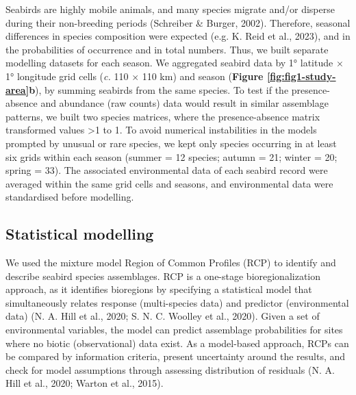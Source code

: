 \documentclass{article}
\begin{document}
\begin{linenumbers}
Seabirds are highly mobile animals, and many species migrate and/or disperse during their non-breeding periods (Schreiber \& Burger, 2002). Therefore, seasonal differences in species composition were expected (e.g. K. Reid et al., 2023), and in the probabilities of occurrence and in total numbers. Thus, we built separate modelling datasets for each season. We aggregated seabird data by 1° latitude \(\times\) 1° longitude grid cells (\emph{c.} 110 \(\times\) 110 km) and season (\textbf{Figure \ref{fig:fig1-study-area}b}), by summing seabirds from the same species. To test if the presence-absence and abundance (raw counts) data would result in similar assemblage patterns, we built two species matrices, where the presence-absence matrix transformed values \textgreater1 to 1. To avoid numerical instabilities in the models prompted by unusual or rare species, we kept only species occurring in at least six grids within each season (summer = 12 species; autumn = 21; winter = 20; spring = 33). The associated environmental data of each seabird record were averaged within the same grid cells and seasons, and environmental data were standardised before modelling.

\hypertarget{statistical-modelling}{%
\subsection{Statistical modelling}\label{statistical-modelling}}

We used the mixture model Region of Common Profiles (RCP) to identify and describe seabird species assemblages. RCP is a one-stage bioregionalization approach, as it identifies bioregions by specifying a statistical model that simultaneously relates response (multi-species data) and predictor (environmental data) (N. A. Hill et al., 2020; S. N. C. Woolley et al., 2020). Given a set of environmental variables, the model can predict assemblage probabilities for sites where no biotic (observational) data exist. As a model-based approach, RCPs can be compared by information criteria, present uncertainty around the results, and check for model assumptions through assessing distribution of residuals (N. A. Hill et al., 2020; Warton et al., 2015).


\end{linenumbers}
\end{document}
